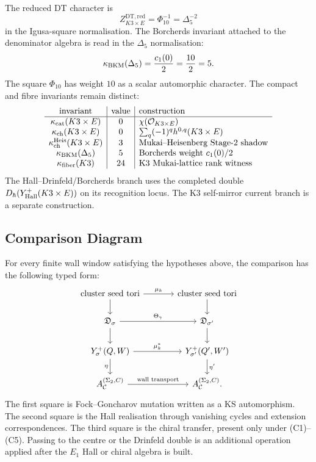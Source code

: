 The reduced DT character is
\[
  Z^{\mathrm{DT},\mathrm{red}}_{K3\times E}
  =
  \Phi_{10}^{-1}
  =
  \Delta_5^{-2}
\]
in the Igusa-square normalisation. The Borcherds invariant attached to
the denominator algebra is read in the $\Delta_5$ normalisation:
\[
  \kappa_{\mathrm{BKM}}(\Delta_5)=\frac{c_1(0)}2=\frac{10}{2}=5.
\]
The square $\Phi_{10}$ has weight $10$ as a scalar automorphic
character. The compact and fibre invariants remain distinct:
\[
\begin{array}{c|c|l}
\text{invariant} & \text{value} & \text{construction}\\
\hline
\kappa_{\mathrm{cat}}(K3\times E) & 0 & \chi(\mathcal{O}_{K3\times E})\\
\kappa_{\mathrm{ch}}(K3\times E) & 0 & \sum_q(-1)^q h^{0,q}(K3\times E)\\
\kappa_{\mathrm{ch}}^{\mathrm{Heis}}(K3\times E) & 3 & \text{Mukai--Heisenberg Stage-2 shadow}\\
\kappa_{\mathrm{BKM}}(\Delta_5) & 5 & \text{Borcherds weight }c_1(0)/2\\
\kappa_{\mathrm{fiber}}(K3) & 24 & \text{K3 Mukai-lattice rank witness}
\end{array}
\]
The Hall--Drinfeld/Borcherds branch uses the completed double
$D_\hbar(Y^{+}_{\mathrm{Hall}}(K3\times E))$ on its recognition locus.
The K3 self-mirror current branch is a separate construction.

\subsection*{Comparison Diagram}
\label{sec:comparison-diagram}

For every finite wall window satisfying the hypotheses above, the
comparison has the following typed form:
\[
\begin{tikzcd}[column sep=large]
  \text{cluster seed tori}
    \arrow[r,"\mu_k"]
    \arrow[d]
  & \text{cluster seed tori}
    \arrow[d]
  \\
  \mathfrak D_\sigma
    \arrow[r,"\Theta_\gamma"]
    \arrow[d]
  & \mathfrak D_{\sigma'}
    \arrow[d]
  \\
  \Yplus_\sigma(Q,W)
    \arrow[r,"\mu_k^*"]
    \arrow[d,"\eta"']
  & \Yplus_{\sigma'}(Q',W')
    \arrow[d,"\eta'"]
  \\
  A_{\cC}^{(\Sigma_2,C)}
    \arrow[r,"\text{wall transport}"]
  & A_{\cC}^{(\Sigma_2,C)} .
\end{tikzcd}
\]
The first square is Fock--Goncharov mutation written as a KS
automorphism. The second square is the Hall realisation through
vanishing cycles and extension correspondences. The third square is the
chiral transfer, present only under (C1)--(C5). Passing to the centre or
the Drinfeld double is an additional operation applied after the
$E_{1}$ Hall or chiral algebra is built.

